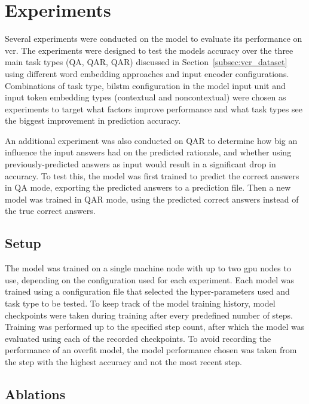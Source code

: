 \section{Experiments}
\label{sec:experiments}

Several experiments were conducted on the model to evaluate its performance on \gls{vcr}.
The experiments were designed to test the models accuracy over the three main task types (Q\rightarrow{}A, QA\rightarrow{}R, Q\rightarrow{}AR) discussed in Section~\ref{subsec:vcr_dataset} using different word embedding approaches and input encoder configurations.
Combinations of task type, \gls{bilstm} configuration in the model input unit and input token embedding types (contextual and noncontextual) were chosen as experiments to target what factors improve performance and what task types see the biggest improvement in prediction accuracy.

An additional experiment was also conducted on QA\rightarrow{}R to determine how big an influence the input answers had on the predicted rationale, and whether using previously-predicted answers as input would result in a significant drop in accuracy.
To test this, the model was first trained to predict the correct answers in Q\rightarrow{}A mode, exporting the predicted answers to a prediction file.
Then a new model was trained in QA\rightarrow{}R mode, using the predicted correct answers instead of the true correct answers.

\subsection{Setup}
\label{subsec:experiment-setup}

The model was trained on a single machine node with up to two \acrshort{gpu} nodes to use, depending on the configuration used for each experiment.
Each model was trained using a configuration file that selected the hyper-parameters used and task type to be tested.
To keep track of the model training history, model checkpoints were taken during training after every predefined number of steps.
Training was performed up to the specified step count, after which the model was evaluated using each of the recorded checkpoints.
To avoid recording the performance of an overfit model, the model performance chosen was taken from the step with the highest accuracy and not the most recent step.

\subsection{Ablations}
\label{subsec:experiment-ablations}

